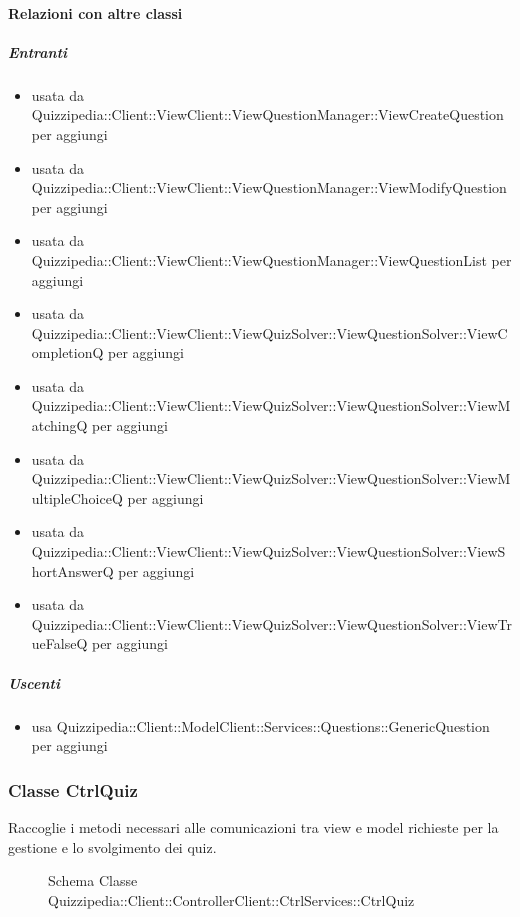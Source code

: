 \paragraph{Relazioni con altre classi}
\subparagraph{Entranti}
\begin{itemize}
\item usata da Quizzipedia::Client::ViewClient::ViewQuestionManager::ViewCreateQuestion per aggiungi
\item usata da Quizzipedia::Client::ViewClient::ViewQuestionManager::ViewModifyQuestion per aggiungi
\item usata da Quizzipedia::Client::ViewClient::ViewQuestionManager::ViewQuestionList per aggiungi
\item usata da Quizzipedia::Client::ViewClient::ViewQuizSolver::ViewQuestionSolver::ViewCompletionQ per aggiungi
\item usata da Quizzipedia::Client::ViewClient::ViewQuizSolver::ViewQuestionSolver::ViewMatchingQ per aggiungi
\item usata da Quizzipedia::Client::ViewClient::ViewQuizSolver::ViewQuestionSolver::ViewMultipleChoiceQ per aggiungi
\item usata da Quizzipedia::Client::ViewClient::ViewQuizSolver::ViewQuestionSolver::ViewShortAnswerQ per aggiungi
\item usata da Quizzipedia::Client::ViewClient::ViewQuizSolver::ViewQuestionSolver::ViewTrueFalseQ per aggiungi
\end{itemize}
\subparagraph{Uscenti}
\begin{itemize}
\item usa Quizzipedia::Client::ModelClient::Services::Questions::GenericQuestion per aggiungi
\end{itemize}
\subsubsection{Classe CtrlQuiz}
Raccoglie i metodi necessari alle comunicazioni tra view e model richieste per la gestione e lo svolgimento dei quiz.
\begin{figure}[H]
\centering
\noindent{}
\caption[Schema Classe CtrlQuiz]{Schema Classe Quizzipedia::Client::ControllerClient::CtrlServices::CtrlQuiz}
\end{figure}
